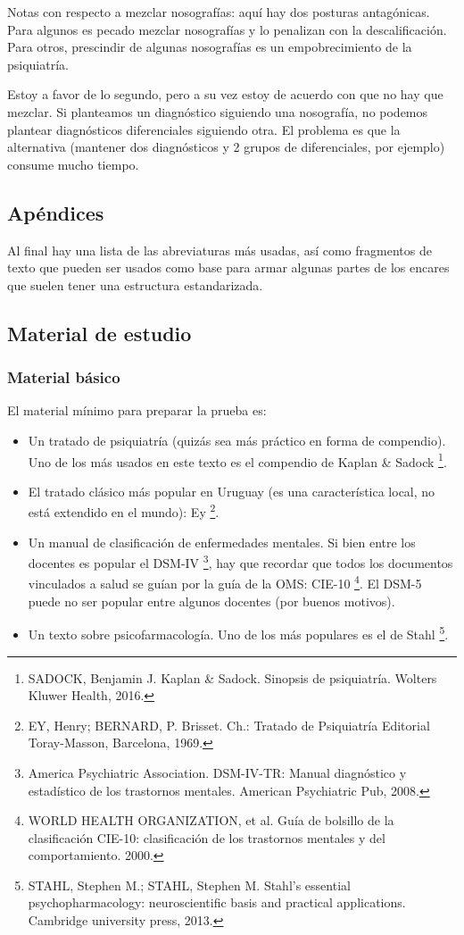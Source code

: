\documentclass[encares.tex]{subfiles}
\begin{document}
Notas con respecto a mezclar nosografías: aquí hay dos posturas antagónicas. Para algunos es pecado mezclar nosografías y lo penalizan con la descalificación. Para otros, prescindir de algunas nosografías es un empobrecimiento de la psiquiatría.

Estoy a favor de lo segundo, pero a su vez estoy de acuerdo con que no hay que mezclar. Si planteamos un diagnóstico siguiendo una nosografía, no podemos plantear diagnósticos diferenciales siguiendo otra. El problema es que la alternativa (mantener dos diagnósticos y 2 grupos de diferenciales, por ejemplo) consume mucho tiempo.

\subsection*{Apéndices}

Al final hay una lista de las abreviaturas más usadas, así como fragmentos de texto que pueden ser usados como base para armar algunas partes de los encares que suelen tener una estructura estandarizada.

\subsection*{Material de estudio}
\subsubsection*{Material básico}

El material mínimo para preparar la prueba es:
\begin{itemize}
\item Un tratado de psiquiatría (quizás sea más práctico en forma de compendio). Uno de los más usados en este texto es el compendio de Kaplan \& Sadock \footnote{SADOCK, Benjamin J. Kaplan \& Sadock. Sinopsis de psiquiatría. Wolters Kluwer Health, 2016.}.
\item El tratado clásico más popular en Uruguay (es una característica local, no está extendido en el mundo): Ey \footnote{EY, Henry; BERNARD, P. Brisset. Ch.: Tratado de Psiquiatría Editorial Toray-Masson, Barcelona, 1969.}.
\item Un manual de clasificación de enfermedades mentales. Si bien entre los docentes es popular el DSM-IV \footnote{America Psychiatric Association. DSM-IV-TR: Manual diagnóstico y estadístico de los trastornos mentales. American Psychiatric Pub, 2008.}, hay que recordar que todos los documentos vinculados a salud se guían por la guía de la OMS: CIE-10 \footnote{WORLD HEALTH ORGANIZATION, et al. Guía de bolsillo de la clasificación CIE-10: clasificación de los trastornos mentales y del comportamiento. 2000.}. El DSM-5 puede no ser popular entre algunos docentes (por buenos motivos).
\item Un texto sobre psicofarmacología. Uno de los más populares es el de Stahl \footnote{STAHL, Stephen M.; STAHL, Stephen M. Stahl's essential psychopharmacology: neuroscientific basis and practical applications. Cambridge university press, 2013.}.
\end{itemize}
\end{document}
